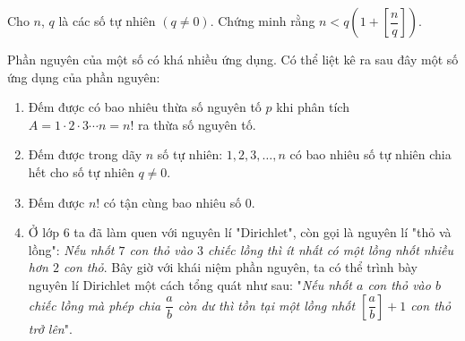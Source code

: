 \begin{vd}\label{nglec5}
	Cho $n$, $q$  là các số tự nhiên $(q\ne 0)$. Chứng minh rằng $n < q\left( 1 + \left[ \dfrac{n}{q} \right]\right)$.
\end{vd}

\begin{dang}
Phần nguyên của một số có khá nhiều ứng dụng. Có thể liệt kê ra sau đây một số ứng dụng của phần nguyên: 	
	\begin{enumerate}[\tickEX]
		\item Đếm được có bao nhiêu thừa số nguyên tố $p$ khi phân tích 
		$A=1\cdot 2\cdot 3\cdots n=n!$ ra thừa số nguyên tố.
		\item Đếm được trong dãy $n$ số tự nhiên: $1, 2, 3,\dots, n$ có bao nhiêu số tự nhiên chia hết cho số tự nhiên $q\ne 0$.
		\item Đếm được $n!$ có tận cùng bao nhiêu số $0$.
		\item Ở lớp $6$ ta đã làm quen với nguyên lí "Dirichlet", còn gọi là nguyên lí "thỏ và lồng": {\em{Nếu nhốt $7$ con thỏ vào $3$ chiếc lồng thì ít nhất có một lồng nhốt nhiều hơn $2$ con thỏ}}. Bây giờ với khái niệm phần nguyên, ta có thể trình bày nguyên lí Dirichlet một cách tổng quát như sau: "{\em{Nếu nhốt $a$ con thỏ vào $b$ chiếc lồng mà phép chia $\dfrac{a}{b}$ còn dư thì tồn tại một lồng nhốt $\left[ \dfrac{a}{b} \right] + 1$ con thỏ trở lên}}".
	\end{enumerate}
\end{dang}

